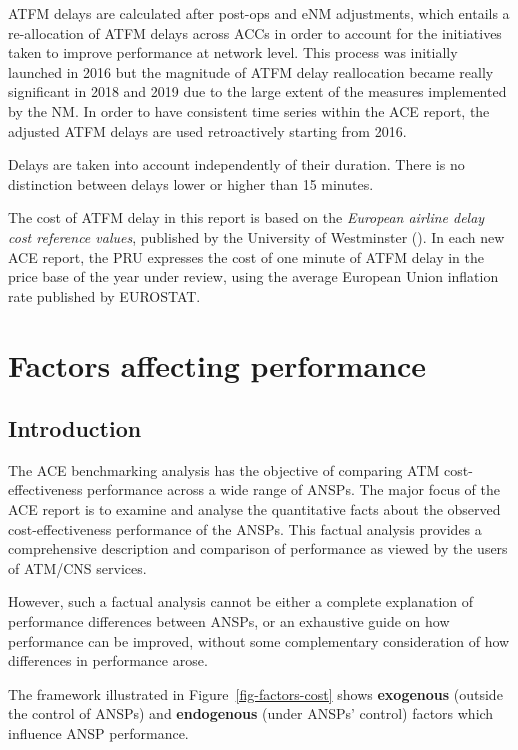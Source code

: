 \documentclass[
  11pt,
  a4paperpaper,
  openany,headsepline=on,footsepline=off,DIV=12,table]{scrbook}
\begin{document}
ATFM delays are calculated after post-ops and eNM adjustments, which
entails a re-allocation of ATFM delays across ACCs in order to account
for the initiatives taken to improve performance at network level. This
process was initially launched in 2016 but the magnitude of ATFM delay
reallocation became really significant in 2018 and 2019 due to the large
extent of the measures implemented by the NM. In order to have
consistent time series within the ACE report, the adjusted ATFM delays
are used retroactively starting from 2016.

Delays are taken into account independently of their duration. There is
no distinction between delays lower or higher than 15 minutes.

The cost of ATFM delay in this report is based on the \emph{European
airline delay cost reference values}, published by the University of
Westminster (). In each new ACE report, the PRU expresses the cost of one minute
of ATFM delay in the price base of the year under review, using the
average European Union inflation rate published by EUROSTAT.


\chapter{Factors affecting
performance}\label{factors-affecting-performance}

\section{Introduction}\label{introduction-1}

The ACE benchmarking analysis has the objective of comparing ATM
cost-effectiveness performance across a wide range of ANSPs. The major
focus of the ACE report is to examine and analyse the quantitative facts
about the observed cost-effectiveness performance of the ANSPs. This
factual analysis provides a comprehensive description and comparison of
performance as viewed by the users of ATM/CNS services.

However, such a factual analysis cannot be either a complete explanation
of performance differences between ANSPs, or an exhaustive guide on how
performance can be improved, without some complementary consideration of
how differences in performance arose.

The framework illustrated in Figure~\ref{fig-factors-cost} shows
\textbf{exogenous} (outside the control of ANSPs) and
\textbf{endogenous} (under ANSPs' control) factors which influence ANSP
performance.
\end{document}
